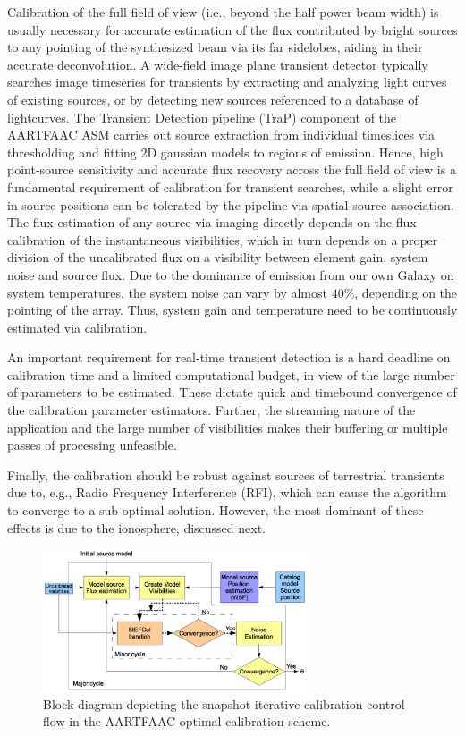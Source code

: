 \documentclass{aa}
\begin{document}
Calibration of the  full field of view (i.e., beyond the  half power beam width)
is usually necessary  for accurate estimation of the  flux contributed by bright
sources to any pointing of the synthesized beam via its far sidelobes, aiding in
their  accurate  deconvolution.  A  wide-field  image  plane transient  detector
typically searches  image timeseries for transients by  extracting and analyzing
light curves  of existing sources, or  by detecting new sources  referenced to a
database   of   lightcurves.     The   Transient   Detection   pipeline   (TraP)
\citep{swinbank2014trap}  component  of  the  AARTFAAC ASM  carries  out  source
extraction  from individual  timeslices via  thresholding and  fitting \mbox{2D}
gaussian models  to regions of  emission.  Hence, high  point-source sensitivity
and  accurate flux  recovery across  the  full field  of view  is a  fundamental
requirement  of calibration  for transient  searches,  while a  slight error  in
source  positions  can   be  tolerated  by  the  pipeline   via  spatial  source
association.  The flux estimation of  any source via imaging directly depends on
the flux calibration of the instantaneous visibilities, which in turn depends on
a proper division of the uncalibrated flux on a visibility between element gain,
system noise  and source flux.   Due to the  dominance of emission from  our own
Galaxy  on system  temperatures, the  system noise  can vary  by  almost $40\%$,
depending on the pointing of the  array.  Thus, system gain and temperature need
to be continuously estimated via calibration.

An important requirement for real-time transient detection is a hard deadline on
calibration time and a limited computational budget, in view of the large number
of parameters to be estimated.  These dictate quick and timebound convergence of
the  calibration parameter  estimators.  Further,  the streaming  nature  of the
application  and the  large  number  of visibilities  makes  their buffering  or
multiple passes of processing unfeasible.

Finally,  the  calibration  should  be  robust against  sources  of  terrestrial
transients due to, e.g., Radio Frequency Interference (RFI), which can cause the
algorithm to converge to a  sub-optimal solution.  However, the most dominant of
these effects is due to the ionosphere, discussed next.

\begin{figure}[tbh]
\centering
\includegraphics[width=0.7\textwidth]{Figs/Fig2_blkdiag.png}
\caption{Block diagram depicting the snapshot
iterative calibration control flow in the AARTFAAC optimal calibration
scheme. }
\label{fig:Block-diagram-depicting}
\end{figure}
\end{document}

